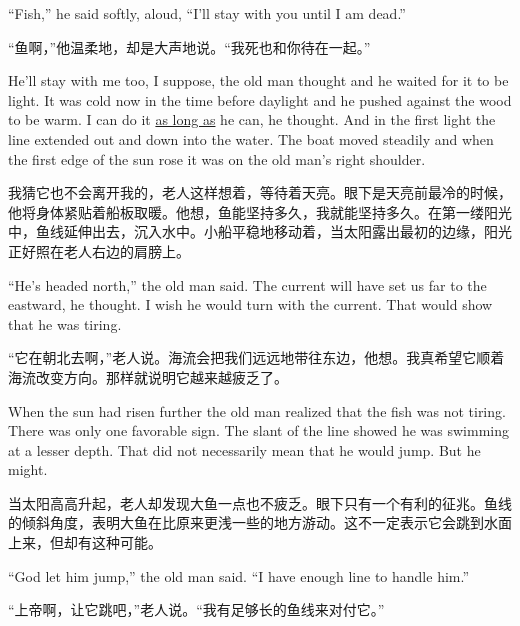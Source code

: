 \begin{paracol}{2}
\switchcolumn*

``Fish,'' he said softly, aloud, ``I'll stay with you until I am dead.''

\switchcolumn

“鱼啊，”他温柔地，却是大声地说。“我死也和你待在一起。”

\switchcolumn*

He'll stay with me too, I \gls{suppose}, the old man thought and he waited for it
to be light. It was cold now in the time before daylight and he pushed
against the wood to be warm. I can do it \uline{as long as} he can, he thought. And
in the first light the line \gls{extended} out and down into the water. The boat
moved steadily and when the first edge of the sun rose it was on the old
man's right shoulder.

\switchcolumn

我猜它也不会离开我的，老人这样想着，等待着天亮。眼下是天亮前最冷的时候，他将身体紧贴着船板取暖。他想，鱼能坚持多久，我就能坚持多久。在第一缕阳光中，鱼线延伸出去，沉入水中。小船平稳地移动着，当太阳露出最初的边缘，阳光正好照在老人右边的肩膀上。

\switchcolumn*

``He's headed north,'' the old man said. The current will have set us far to
the eastward, he thought. I wish he would turn with the current. That would
show that he was tiring.

\switchcolumn

“它在朝北去啊，”老人说。海流会把我们远远地带往东边，他想。我真希望它顺着海流改变方向。那样就说明它越来越疲乏了。

\switchcolumn*

When the sun had risen further the old man \gls{realized} that the fish was
not tiring. There was only one \gls{favorable} sign. The slant of the line
showed he was swimming at a lesser depth. That did not \gls{necessarily}
mean that he would jump. But he might.

\switchcolumn

当太阳高高升起，老人却发现大鱼一点也不疲乏。眼下只有一个有利的征兆。鱼线的倾斜角度，表明大鱼在比原来更浅一些的地方游动。这不一定表示它会跳到水面上来，但却有这种可能。

\switchcolumn*

``God let him jump,'' the old man said. ``I have enough line to \gls{handle}
him.''

\switchcolumn

“上帝啊，让它跳吧，”老人说。“我有足够长的鱼线来对付它。”


\end{paracol}
